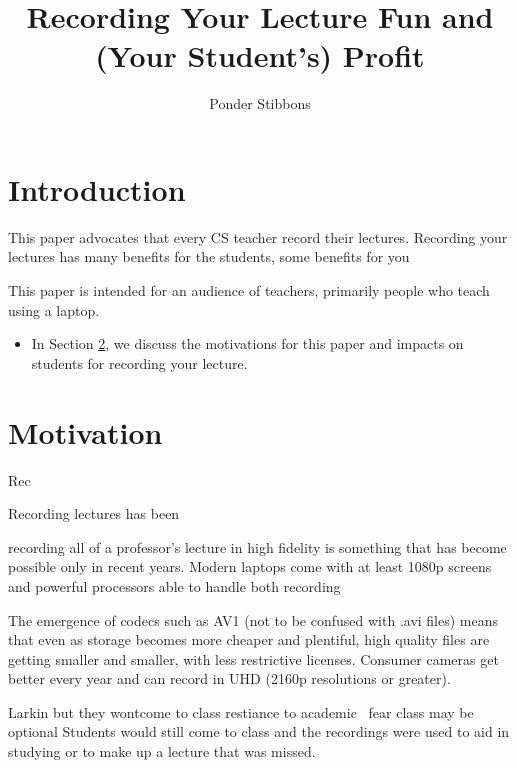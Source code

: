 \documentclass[sigconf]{acmart}
\title{Recording Your Lecture Fun and (Your Student's) Profit}
\author{Ponder Stibbons}
\affiliation{\institution{Unseen University}}
\begin{document}
\maketitle



\section{Introduction}


This paper advocates that every CS teacher record their lectures.
Recording your lectures has many benefits for the students, some benefits for you

This paper is intended for an audience of teachers, primarily people who teach using a laptop.




\begin{itemize}
	\item In Section \ref{why}, we discuss the motivations for this paper and impacts  on students for recording your lecture.
\end{itemize}
\section{Motivation}
\label{why}
Rec

Recording lectures has been

recording all of a professor's lecture in high fidelity is something that has become possible only in recent years.
Modern laptops come with at least 1080p screens and powerful processors able to handle both recording 

The emergence of codecs such as AV1 \cite{AV1comp} (not to be confused with .avi files) means that even as storage becomes more cheaper and plentiful, high quality files are getting smaller and smaller, with less restrictive licenses. 
Consumer cameras get better every year and can record in UHD (2160p resolutions or greater).



Larkin but they wontcome to class restiance to academic \
fear class may be optional
Students would still come to class and the recordings were used to aid in studying or to make up a lecture that was missed.
\end{document}
